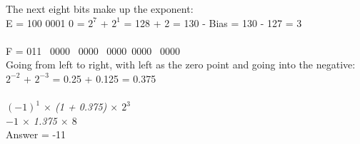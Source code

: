 \documentclass[11pt]{article}
\begin{document}
\begin{itemize}
\begin{itemize}
{{{         The next eight bits make up the exponent: \\
         E = 100 0001 0 = $2^7$ + $2^1$ = 128 + 2 = 130 - Bias = 130 - 127 = 3\\
         \\
         F = 011 \ 0000 \ 0000 \ 0000\ 0000 \ 0000\\
         Going from left to right, with left as the zero point and going into the negative:\\
         $2^{-2}$ + $2^{-3}$ = 0.25 + 0.125 = 0.375\\
         \\
         \textsl{$(-1)^1$ $\times$ (1 + 0.375) $\times$ $2^3$}\\
          \textsl{$-1$ $\times$ 1.375 $\times$ $8$}\\
          Answer = -11
       }}
    }
 \end{itemize}
\end{itemize}


\end{document}
